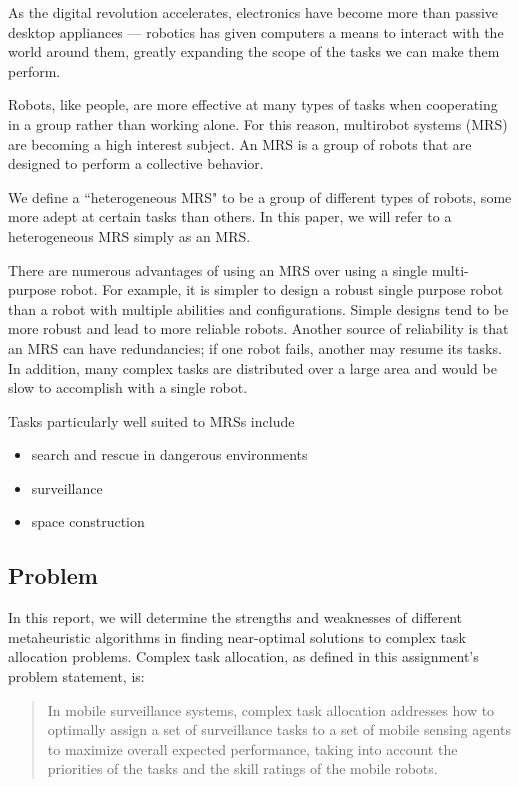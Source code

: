 \documentclass[a4paper]{article}
\begin{document}
As the digital revolution accelerates, electronics have become more than passive desktop appliances --- robotics has given computers a means to interact with the world around them, greatly expanding the scope of the tasks we can make them perform.

Robots, like people, are more effective at many types of tasks when cooperating in a group rather than working alone. For this reason, multirobot systems (MRS) are becoming a high interest subject. An MRS is a group of robots that are designed to perform a collective behavior.

We define a ``heterogeneous MRS" to be a group of different types of robots, some more adept at certain tasks than others. In this paper, we will refer to a heterogeneous MRS simply as an MRS.

There are numerous advantages of using an MRS over using a single multi-purpose robot. For example, it is simpler to design a robust single purpose robot than a robot with multiple abilities and configurations. Simple designs tend to be more robust and lead to more reliable robots. Another source of reliability is that an MRS can have redundancies; if one robot fails, another may resume its tasks.  In addition, many complex tasks are distributed over a large area and would be slow to accomplish with a single robot.

Tasks particularly well suited to MRSs include
\begin{itemize}
\item search and rescue in dangerous environments
\item surveillance
\item space construction
\end{itemize}


\subsection{Problem}

In this report, we will determine the strengths and weaknesses of different metaheuristic algorithms in finding near-optimal solutions to complex task allocation problems. Complex task allocation, as defined in this assignment's problem statement, is:
\begin{quote}
  In mobile surveillance systems, complex task allocation addresses how to optimally assign a set of surveillance tasks to a set of mobile sensing agents to maximize overall expected performance, taking into account the priorities of the tasks and the skill ratings of the mobile robots.
\end{quote}
\end{document}
